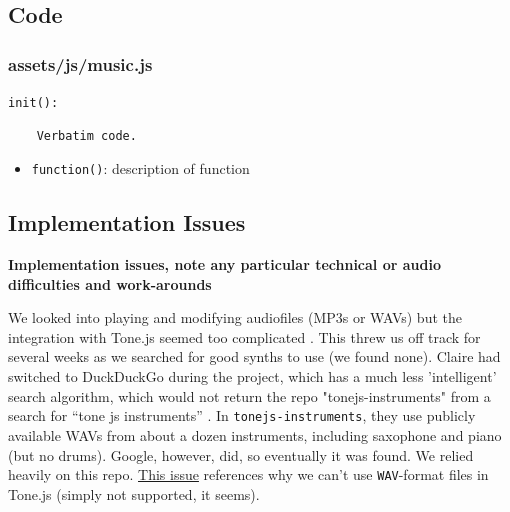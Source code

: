 \documentclass[12pt,a4paper]{article}
\newcommand{\code}{\texttt}
\newcommand{\lightcode}[1]{\colorbox{light-gray}{\texttt{#1}}}
\begin{document}

\subsection{Code}

\subsubsection{assets/js/music.js}

\begin{center}
\code{init():}
	\begin{verbatim}
	Verbatim code.
	\end{verbatim}
\end{center}

\begin{itemize}
	\item \code{function()}: description of function
\end{itemize}

\subsection{Implementation Issues}
\textbf{Implementation issues, note any particular technical or audio difficulties and work-arounds}

We looked into playing and modifying audiofiles (MP3s or WAVs) but the integration with Tone.js seemed too complicated \cite{tonejs-issue}. This threw us off track for several weeks as we searched for good synths to use (we found none). Claire had switched to DuckDuckGo during the project, which has a much less 'intelligent' search algorithm, which would not return the repo "tonejs-instruments" from a search for ``tone js instruments'' \cite{tonejs-instruments}. In \lightcode{tonejs-instruments}, they use publicly available WAVs from about a dozen instruments, including saxophone and piano (but no drums). Google, however, did, so eventually it was found. We relied heavily on this repo. \href{https://github.com/Tonejs/Tone.js/issues/290}{This issue} references why we can't use \code{WAV}-format files in Tone.js (simply not supported, it seems). 
\end{document}

